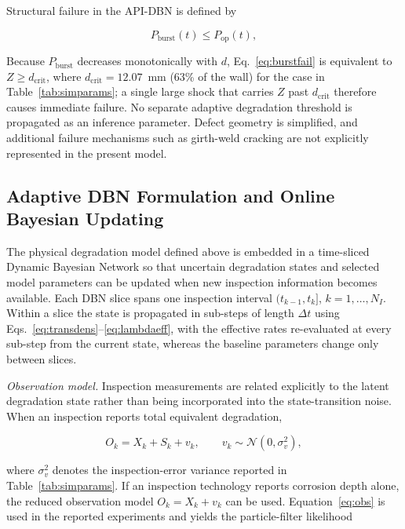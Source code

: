 \documentclass[journal]{IEEEtran}
\begin{document}
Structural failure in the API-DBN is defined by

\begin{equation}
P_{\mathrm{burst}}(t)
\le
P_{\mathrm{op}}(t),
\label{eq:burstfail}
\end{equation}

Because $P_{\mathrm{burst}}$ decreases monotonically with $d$,
Eq.~\eqref{eq:burstfail} is equivalent to $Z\ge d_{\mathrm{crit}}$,
where $d_{\mathrm{crit}}=12.07$~mm (63\% of the wall) for the case in
Table~\ref{tab:simparams}; a single large shock that carries $Z$ past
$d_{\mathrm{crit}}$ therefore causes immediate failure. No separate
adaptive degradation threshold is propagated as an inference
parameter. Defect geometry is simplified, and additional failure
mechanisms such as girth-weld cracking are not explicitly represented
in the present model.



\subsection{Adaptive DBN Formulation and Online Bayesian Updating}
\label{sec:dbn}

The physical degradation model defined above is embedded in a
time-sliced Dynamic Bayesian Network so that uncertain degradation
states and selected model parameters can be updated when new inspection
information becomes available. Each DBN slice spans one inspection
interval $(t_{k-1},t_k]$, $k=1,\dots,N_I$. Within a slice the state is
propagated in sub-steps of length $\Delta t$ using
Eqs.~\eqref{eq:transdens}--\eqref{eq:lambdaeff}, with the effective
rates re-evaluated at every sub-step from the current state, whereas
the baseline parameters change only between slices.



\textit{Observation model.}
Inspection measurements are related explicitly to the latent
degradation state rather than being incorporated into the
state-transition noise. When an inspection reports total equivalent
degradation,

\begin{equation}
O_k=X_k+S_k+v_k,
\qquad
v_k\sim\mathcal{N}(0,\sigma_v^2),
\label{eq:obs}
\end{equation}

where $\sigma_v^2$ denotes the inspection-error variance reported in
Table~\ref{tab:simparams}. If an inspection technology reports
corrosion depth alone, the reduced observation model
$O_k=X_k+v_k$ can be used. Equation~\eqref{eq:obs} is used in the
reported experiments and yields the particle-filter likelihood
\end{document}
